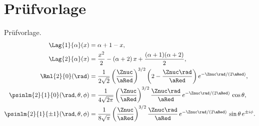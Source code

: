 \chapter{Prüfvorlage}\label{c11}

Prüfvorlage.
\begin{align}
  \Lag{1}{\alpha}(x) &= \alpha + 1 - x,
    \label{c11.eq.lag1} \\
  \Lag{2}{\alpha}(x) &= \frac{x^2}{2} - (\alpha + 2)\,x + \frac{(\alpha + 1)(\alpha + 2)}{2},
    \label{c11.eq.lag2} \\
  \Rnl{2}{0}(\rad) &= \frac{1}{2\sqrt{2}}\left(\frac{\Znuc}{\aRed}\right)^{3/2}\left(2 - \frac{\Znuc\rad}{\aRed}\right) e^{-\Znuc\rad/(2\aRed)},
    \label{c11.eq.r20} \\
  \psinlm{2}{1}{0}(\rad, \theta, \phi) &= \frac{1}{4\sqrt{2\pi}}\left(\frac{\Znuc}{\aRed}\right)^{3/2}\frac{\Znuc\rad}{\aRed}\,e^{-\Znuc\rad/(2\aRed)}\,\cos\theta,
    \label{c11.eq.psi210} \\
  \psinlm{2}{1}{\pm 1}(\rad, \theta, \phi) &= \frac{1}{8\sqrt{\pi}}\left(\frac{\Znuc}{\aRed}\right)^{3/2}\frac{\Znuc\rad}{\aRed}\,e^{-\Znuc\rad/(2\aRed)}\,\sin\theta\,e^{\pm i\phi}.
    \label{c11.eq.psi21pm}
\end{align}
